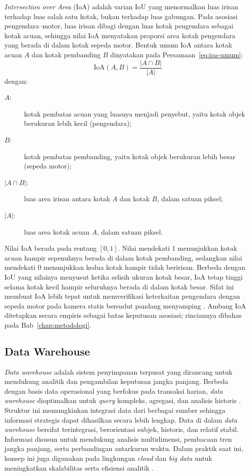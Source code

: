 \textit{Intersection over Area} (IoA) adalah varian IoU yang menormalkan luas
irisan terhadap luas salah satu kotak, bukan terhadap luas gabungan. Pada
asosiasi pengendara--motor, luas irisan dibagi dengan luas kotak pengendara
sebagai kotak acuan, sehingga nilai IoA menyatakan proporsi area kotak
pengendara yang berada di dalam kotak sepeda motor. Bentuk umum IoA antara kotak
acuan $A$ dan kotak pembanding $B$ dinyatakan pada Persamaan~\ref{eq:ioa-umum}:
\begin{equation}
\label{eq:ioa-umum}
\text{IoA}(A,B) = \frac{|A \cap B|}{|A|}
\end{equation}
\noindent dengan:
\begin{description}
  \item[$A$:] kotak pembatas acuan yang luasnya menjadi penyebut, yaitu kotak objek berukuran lebih kecil (pengendara);
  \item[$B$:] kotak pembatas pembanding, yaitu kotak objek berukuran lebih besar (sepeda motor);
  \item[$|A \cap B|$:] luas area irisan antara kotak $A$ dan kotak $B$, dalam satuan piksel;
  \item[$|A|$:] luas area kotak acuan $A$, dalam satuan piksel.
\end{description}

Nilai IoA berada pada rentang $[0,1]$. Nilai mendekati 1 menunjukkan kotak acuan
hampir sepenuhnya berada di dalam kotak pembanding, sedangkan nilai mendekati 0
menunjukkan kedua kotak hampir tidak beririsan. Berbeda dengan IoU yang nilainya
menyusut ketika selisih ukuran kotak besar, IoA tetap tinggi selama kotak kecil
hampir seluruhnya berada di dalam kotak besar. Sifat ini membuat IoA lebih tepat
untuk memverifikasi keterkaitan pengendara dengan sepeda motor pada kamera
statis bersudut pandang menyamping \cite{shoman2024enforcing}. Ambang IoA
ditetapkan secara empiris sebagai batas keputusan asosiasi; rinciannya dibahas
pada Bab~\ref{chap:metodologi}.

\subsection{Data Warehouse}

\textit{Data warehouse} adalah sistem penyimpanan terpusat yang dirancang
untuk mendukung analitik dan pengambilan keputusan jangka panjang. Berbeda
dengan basis data operasional yang berfokus pada transaksi harian,
\textit{data warehouse} dioptimalkan untuk \textit{query} kompleks, agregasi,
dan analisis historis \cite{vyas2025demystifying}. Struktur ini memungkinkan
integrasi data dari berbagai sumber sehingga informasi strategis dapat
dihasilkan secara lebih lengkap. Data di dalam \textit{data warehouse}
bersifat terintegrasi, berorientasi subjek, historis, dan relatif stabil.
Informasi disusun untuk mendukung analisis multidimensi, pembacaan tren
jangka panjang, serta perbandingan antarkurun waktu. Dalam praktik saat ini,
konsep ini juga digunakan pada
lingkungan \textit{cloud} dan \textit{big data} untuk meningkatkan
skalabilitas serta efisiensi analitik \cite{golfarelli2024bigdata}.
